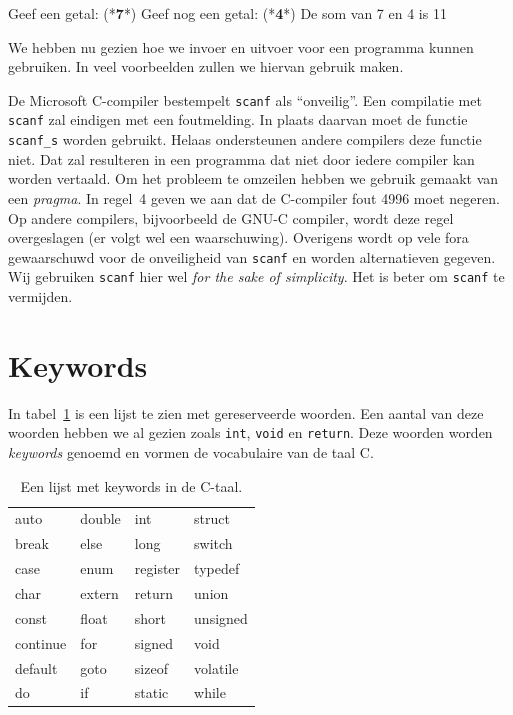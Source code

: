\begin{dosbox}[title=Uitvoer van het programma in listing~\ref{cod:sumoftwo}.,label=fig:unuitvoerprog]
Geef een getal: (*\textbf{7}*)
Geef nog een getal: (*\textbf{4}*)
De som van 7 en 4 is 11
\end{dosbox}

We hebben nu gezien hoe we invoer en uitvoer voor een programma kunnen gebruiken. In veel voorbeelden zullen we hiervan gebruik maken.

\begin{infobox}
\label{fig:unopmerkingscanf}%
De Microsoft C-compiler bestempelt \texttt{scanf} als ``onveilig''. Een compilatie met \texttt{scanf} zal eindigen met een foutmelding. In plaats daarvan moet de functie \texttt{scanf\_s} worden gebruikt. Helaas ondersteunen andere compilers deze functie niet. Dat zal resulteren in een programma dat niet door iedere compiler kan worden vertaald. Om het probleem te omzeilen hebben we gebruik gemaakt van een \textsl{pragma}. In regel~4 geven we aan dat de C-compiler fout 4996 moet negeren. Op andere compilers, bijvoorbeeld de GNU-C compiler, wordt deze regel overgeslagen (er volgt wel een waarschuwing). Overigens wordt op vele fora gewaarschuwd voor de onveiligheid van \texttt{scanf} en worden alternatieven gegeven. Wij gebruiken \texttt{scanf} hier wel \textsl{for the sake of simplicity}. Het is beter om \texttt{scanf} te vermijden.
\end{infobox}

\section{Keywords}

In tabel~\ref{tab:unkeywords} is een lijst te zien met gereserveerde woorden. Een aantal van deze woorden hebben we al gezien zoals \texttt{int}, \texttt{void} en \texttt{return}. Deze woorden worden \textsl{keywords} genoemd en vormen de vocabulaire van de taal C.

\begin{table}[!ht]
\caption{Een lijst met keywords in de C-taal.}
\label{tab:unkeywords}
\centering\ttfamily
\begin{tabular}{p{2.5cm}p{2.5cm}p{2.5cm}p{2.5cm}}
\toprule
auto &  double &  int & struct \\
break & else  & long  &  switch \\
case & enum & register & typedef \\
char & extern & return & union \\
const & float & short &  unsigned \\
continue & for & signed & void \\
default & goto & sizeof & volatile \\
do & if & static & while \\
\bottomrule
\end{tabular}
\end{table}

